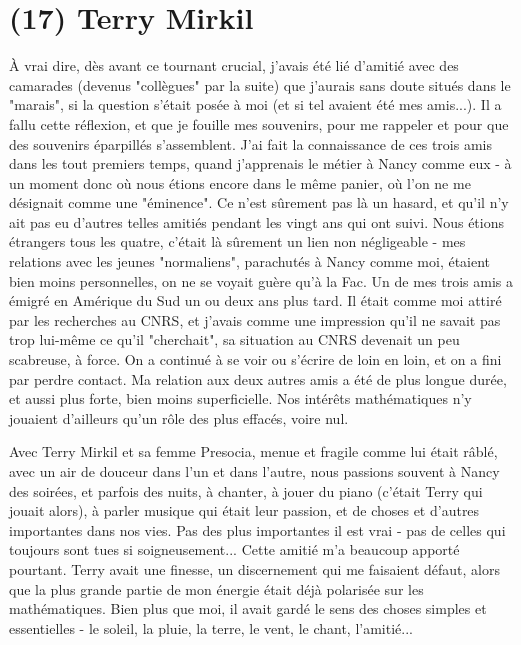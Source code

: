 \section{(17) Terry Mirkil}

À vrai dire, dès avant ce tournant crucial, j'avais été lié d'amitié avec des camarades (devenus "collègues" par la suite) que j'aurais sans doute situés dans le "marais", si la question s'était posée à moi (et si tel avaient été mes amis...). Il a fallu cette réflexion, et que je fouille mes souvenirs, pour me rappeler et pour que des souvenirs éparpillés s'assemblent. J'ai fait la connaissance de ces trois amis dans les tout premiers temps, quand j'apprenais le métier à Nancy comme eux - à un moment donc où nous étions encore dans le même panier, où l'on ne me désignait comme une "éminence". Ce n'est sûrement pas là un hasard, et qu'il n'y ait pas eu d'autres telles amitiés pendant les vingt ans qui ont suivi. Nous étions étrangers tous les quatre, c'était là sûrement un lien non négligeable - mes relations avec les jeunes "normaliens", parachutés à Nancy comme moi, étaient bien moins personnelles, on ne se voyait guère qu'à la Fac. Un de mes trois amis a émigré en Amérique du Sud un ou deux ans plus tard. Il était comme moi attiré par les recherches au CNRS, et j'avais comme une impression qu'il ne savait pas trop lui-même ce qu'il "cherchait", sa situation au CNRS devenait un peu scabreuse, à force. On a continué à se voir ou s'écrire de loin en loin, et on a fini par perdre contact. Ma relation aux deux autres amis a été de plus longue durée, et aussi plus forte, bien moins superficielle. Nos intérêts mathématiques n'y jouaient d'ailleurs qu'un rôle des plus effacés, voire nul.

Avec Terry Mirkil et sa femme Presocia, menue et fragile comme lui était râblé, avec un air de douceur dans l'un et dans l'autre, nous passions souvent à Nancy des soirées, et parfois des nuits, à chanter, à jouer du piano (c'était Terry qui jouait alors), à parler musique qui était leur passion, et de choses et d'autres importantes dans nos vies. Pas des plus importantes il est vrai - pas de celles qui toujours sont tues si soigneusement... Cette amitié m'a beaucoup apporté pourtant. Terry avait une finesse, un discernement qui me faisaient défaut, alors que la plus grande partie de mon énergie était déjà polarisée sur les mathématiques. Bien plus que moi, il avait gardé le sens des choses simples et essentielles - le soleil, la pluie, la terre, le vent, le chant, l'amitié...

